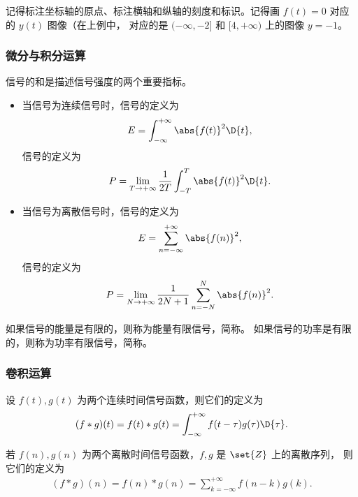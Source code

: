 \begin{note}
    记得标注坐标轴的原点、标注横轴和纵轴的刻度和标识。记得画 $f(t) = 0$ 对应的 $y(t)$ 图像（在上例中，
    对应的是 $(-\infty, -2]$ 和 $[4, +\infty)$ 上的图像 $y = -1$。
\end{note}

\subsubsection{微分与积分运算}

\begin{definition}[信号的能量与功率]
    信号的和是描述信号强度的两个重要指标。
    \begin{itemize}
        \item 当信号为连续信号时，信号的定义为
            \begin{align*}
                E = \int_{-\infty}^{+\infty}\abs{f(t)}^2\D{t},
            \end{align*}
            信号的定义为
            \begin{align*}
                P = \lim_{T \to +\infty}\frac{1}{2T}\int_{-T}^{T}\abs{f(t)}^2\D{t}.
            \end{align*}
        \item 当信号为离散信号时，信号的定义为
            \begin{align*}
                E = \sum_{n = -\infty}^{+\infty}\abs{f(n)}^2,
            \end{align*}
            信号的定义为
            \begin{align*}
                P = \lim_{N \to +\infty}\frac{1}{2N + 1}\sum_{n = -N}^{N}\abs{f(n)}^2.
            \end{align*}
    \end{itemize}
\end{definition}

\begin{definition}[能量信号与功率信号]
    如果信号的能量是有限的，则称为能量有限信号，简称。
    如果信号的功率是有限的，则称为功率有限信号，简称。
\end{definition}

\subsubsection{卷积运算}

\begin{definition}
    设 $f(t), g(t)$ 为两个连续时间信号函数，则它们的定义为
    \begin{align*}
        (f * g)(t) = f(t) * g(t) = \int_{-\infty}^{+\infty}f(t - \tau)g(\tau)\D{\tau}.
    \end{align*}

    若 $f(n), g(n)$ 为两个离散时间信号函数，$f, g$ 是 $\set{Z}$ 上的离散序列，
    则它们的定义为
    \begin{align*}
        (f * g)(n) = f(n) * g(n) = \sum_{k = -\infty}^{+\infty}f(n - k)g(k).
    \end{align*}
\end{definition}

